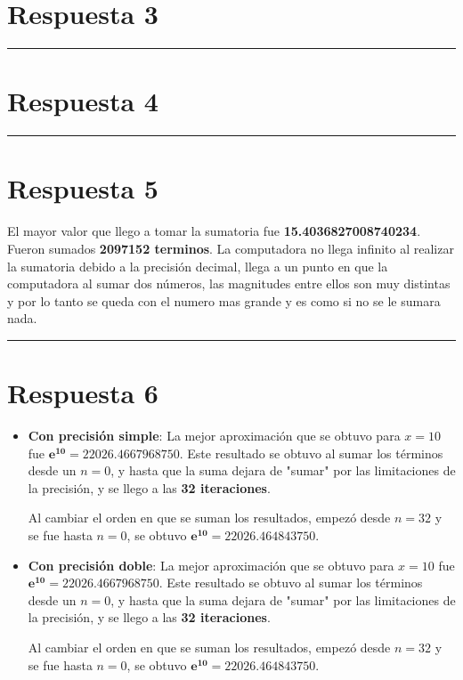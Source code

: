 \documentclass{article}
\begin{document}
\section*{Respuesta 3}



\hrule
\section*{Respuesta 4}



\hrule
\section*{Respuesta 5}
El mayor valor que llego a tomar la sumatoria fue \textbf{15.4036827008740234}.
Fueron sumados \textbf{2097152 terminos}. 
La computadora no llega infinito al realizar la sumatoria debido
a la precisión decimal, llega a un punto en que la computadora al sumar dos números, las magnitudes entre ellos
son muy distintas y por lo tanto se queda con el numero mas grande y es como si no se le sumara nada.


\hrule
\section*{Respuesta 6}
\begin{itemize}
	\item \textbf{Con precisión simple}:
	La mejor aproximación que se obtuvo para $x = 10$ fue $\boldsymbol{e^{10} = 22026.4667968750}$.
	Este resultado se obtuvo al sumar los términos desde un $n = 0$, y hasta que la suma dejara de "sumar" por
	las limitaciones de la precisión, y se llego a las \textbf{32 iteraciones}.
	
	Al cambiar el orden en que se suman los resultados, empezó desde $n = 32$ y se fue hasta $n = 0$, se obtuvo
	$\boldsymbol{e^{10} = 22026.464843750}$.
	
	\item \textbf{Con precisión doble}:
	La mejor aproximación que se obtuvo para $x = 10$ fue $\boldsymbol{e^{10} = 22026.4667968750}$.
	Este resultado se obtuvo al sumar los términos desde un $n = 0$, y hasta que la suma dejara de "sumar" por
	las limitaciones de la precisión, y se llego a las \textbf{32 iteraciones}.
	
	Al cambiar el orden en que se suman los resultados, empezó desde $n = 32$ y se fue hasta $n = 0$, se obtuvo
	$\boldsymbol{e^{10} = 22026.464843750}$. 
\end{itemize}
\end{document}
